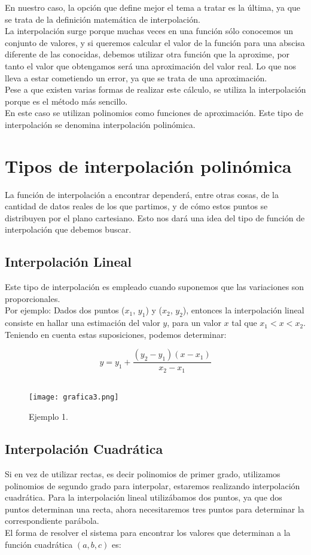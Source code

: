 \documentclass[spanish,a4paper,11pt,twoside]{report}
\begin{document}
En nuestro caso, la opción que define mejor el tema a tratar es la última, ya que se trata de la definición matemática de interpolación.\\
La interpolación surge porque muchas veces en una función sólo conocemos un conjunto de valores, y si queremos calcular el valor de la función para una abscisa diferente de las conocidas, debemos utilizar otra función que la aproxime, por tanto el valor que obtengamos será una aproximación del valor real. Lo que nos lleva a estar cometiendo un error, ya que se trata de una aproximación.\\
Pese a que existen varias formas de realizar este cálculo, se utiliza la interpolación porque es el método más sencillo.\\
En este caso se utilizan polinomios como funciones de aproximación. Este tipo de interpolación se denomina interpolación polinómica.\\


\section{Tipos de interpolación polinómica}
\label{2:sec:1}
  La función de interpolación a encontrar dependerá, entre otras cosas, de la cantidad de datos reales de los que partimos, y de cómo estos puntos se distribuyen por el plano cartesiano. Esto nos dará una idea del tipo de función de interpolación que debemos buscar.

\subsection{Interpolación Lineal}
  Este tipo de interpolación es empleado cuando suponemos que las variaciones son proporcionales.\\
  Por ejemplo: 
Dados dos puntos ($x_1$, $y_1$) y  ($x_2$, $y_2$), entonces la interpolación lineal consiste en hallar una estimación del valor $y$, para un valor $x$  tal que $x_1<x <x_2$. Teniendo en cuenta estas suposiciones, podemos determinar:

\[
y = y_1 + \frac{(y_2 - y_1)(x - x_1)}{x_2 - x_1}
\]\\ 
\begin{figure}
\begin{center}
\texttt{[image: grafica3.png]}
\caption{Ejemplo 1.}
\label{Ejemplo 1}
\end{center}
\end{figure}


\subsection{Interpolación Cuadrática}
Si en vez de utilizar rectas, es decir polinomios de primer grado, utilizamos polinomios de segundo grado para interpolar, estaremos realizando interpolación cuadrática. Para la interpolación lineal utilizábamos dos puntos, ya que dos puntos determinan una recta, ahora necesitaremos tres puntos para determinar la correspondiente parábola.\\
El forma de resolver el sistema para encontrar los valores que determinan a la función cuadrática $(a, b, c)$ es:
\end{document}
